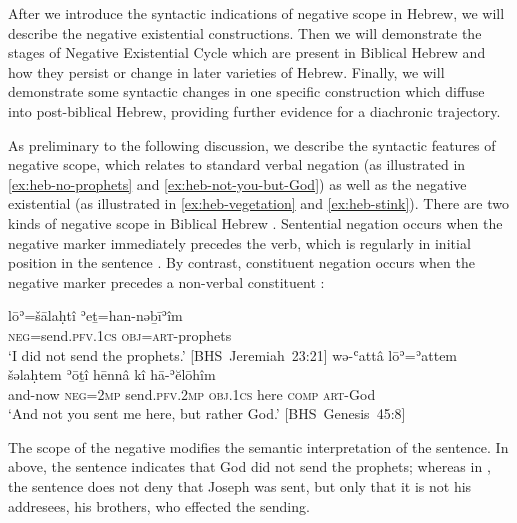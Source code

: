 ﻿\documentclass[output=paper]{langsci/langscibook}
\begin{document}
After we introduce the syntactic indications of negative scope in Hebrew,
we will describe the negative existential constructions. Then we will
demonstrate the stages of  Negative Existential Cycle
which are present in Biblical Hebrew and how they persist or change in
later varieties of Hebrew. Finally, we will demonstrate some syntactic
changes in one specific construction which diffuse into post-biblical
Hebrew, providing further evidence for a diachronic trajectory. 

As preliminary to the following discussion, we describe the syntactic
features of negative scope, which relates to standard verbal negation (as
illustrated in \ref{ex:heb-no-prophets} and \ref{ex:heb-not-you-but-God})
as well as the negative existential (as illustrated in
\ref{ex:heb-vegetation} and \ref{ex:heb-stink}). There are two kinds of
negative scope in Biblical Hebrew 
\parencites{SnymanNaude2003}{Snyman2004}{NaudeRendsburg2013}. Sentential negation occurs when the negative
marker immediately precedes the verb, which is regularly in initial
position in the sentence . %
%
By contrast, constituent negation occurs when the negative marker precedes
a non-verbal constituent :
%
\begin{exe}
\ex\label{ex:heb-send-prophets-God}\begin{xlist}
\ex \label{ex:heb-no-prophets}
\gll lōʾ=šālaḥtî ʾeṯ=han-nəḇīʾîm\\
   \textsc{neg}=send.\textsc{pfv.1cs}  \textsc{obj}=\textsc{art}-prophets\\
   \glt `I did not send the prophets.' \mbox{[BHS
   Jeremiah 23:21]}
\ex \label{ex:heb-not-you-but-God}
\gll wə-ʿattâ lōʾ=ʾattem šəlaḥtem ʾōṯî hēnnâ kî hā-ʾĕlōhîm\\
  and-now \textsc{neg}=\textsc{2mp} send.\textsc{pfv.2mp} \textsc{obj.1cs}
  here   \textsc{comp} \textsc{art}-God\\
\glt `And not you sent me here, but rather God.'
\mbox{[BHS Genesis 45:8]}
  \end{xlist}
  \end{exe}
The scope of the negative modifies the semantic interpretation of the
sentence. In  above, the sentence indicates that
God did not send the prophets; whereas in , the sentence does not deny that Joseph was sent, but only that it is not his addresees, his brothers, who effected the sending.
\end{document}

